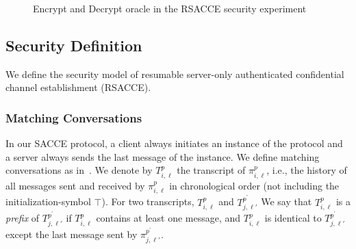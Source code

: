 \begin{figure*}[!htb]
\begin{center}
\caption{Encrypt and Decrypt oracle in the RSACCE security experiment}
 \label{fig:LHAE_rsacce}
\end{center}
\end{figure*}

\subsection{Security Definition} \label{sec:sec_def}

We define the security model of resumable server-only authenticated confidential channel establishment
(RSACCE).


\subsubsection{Matching Conversations}
In our SACCE protocol, a client always initiates an instance of the protocol and
a server always sends the last message of the instance.
We define matching conversations as in~\cite{JKSS12:ACCE}.
We denote by $T^p_{i,\ell}$ the transcript of $\pi^p_{i,\ell}$, i.e., the history of
all messages sent and received by $\pi^p_{i,\ell}$ in chronological order (not including the initialization-symbol $\top$).
For two transcripts, $T^p_{i,\ell}$ and $T^{p^{\prime}}_{j,\ell'}$
We say that $T^p_{i,\ell}$ is a \textit{prefix} of $T^{p^{\prime}}_{j,\ell'}$ if
$T^p_{i,\ell}$ contains at least one message, and
$T^p_{i,\ell}$ is identical to $T^{p^{\prime}}_{j,\ell'}$ except the last message sent
by $\pi^{p^{\prime}}_{j,\ell'}$.

